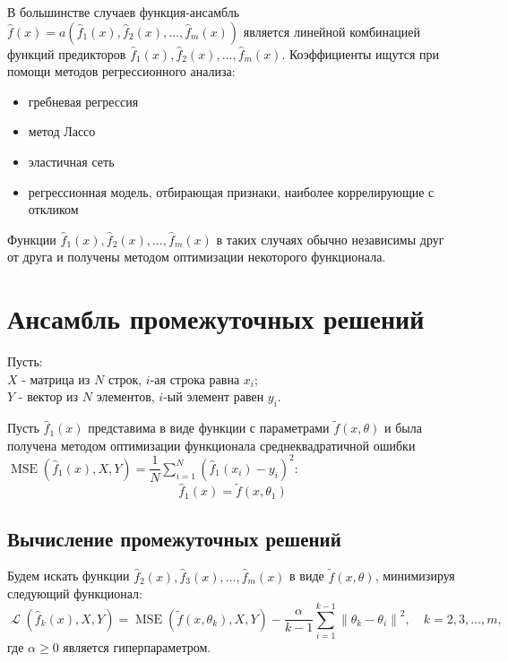 \documentclass[12pt, fleqn]{article}
\newcommand{\norm}[1]{\left\lVert#1\right\rVert}
\newcommand{\loss}{\mathop{\mathcal{L}}}
\newcommand{\mse}{\mathop{MSE}}
\newcommand{\optimizationmethodfunction}{\tilde{f}}
\newcommand{\predictionfunction}{\hat{f}}
\newcommand{\ensemblefunction}{a}
\newcommand{\distinguishparameter}{\alpha}
\newcommand{\numberobjects}{N}
\newcommand{\numberpredictionfunctions}{m}
\newcommand{\for}[3]{\sum\limits_{#1 = #2}^{#3}}  %
\newcommand{\forn}[2]{\for{#1}{1}{#2}}  %
\newcommand{\many}[3]{#1 1 #2, #1 2 #2, \dots, #1 #3 #2}  %
\newcommand{\ensemblefunctionfull}{\ensemblefunction(\many{\predictionfunction_}{(x)}{\numberpredictionfunctions})}
\begin{document}
В большинстве случаев функция-ансамбль $\predictionfunction(x) = \ensemblefunctionfull$ является линейной комбинацией функций предикторов $\many{\predictionfunction_}{(x)}{\numberpredictionfunctions}$. Коэффициенты ищутся при помощи методов регрессионного анализа:
\begin{itemize}
\item гребневая регрессия~\cite{Ridge}
\item метод Лассо~\cite{Lasso}
\item эластичная сеть~\cite{ElasticNet}
\item регрессионная модель, отбирающая признаки, наиболее коррелирующие с откликом~\cite{ConvexCombinationsBestCorrelatedWithResponse}
\end{itemize}

Функции $\many{\predictionfunction_}{(x)}{\numberpredictionfunctions}$ в таких случаях обычно независимы друг от друга и получены методом оптимизации некоторого функционала.

\section{Ансамбль промежуточных решений}

Пусть:\\
$X$ - матрица из $\numberobjects$ строк, $i$-ая строка равна $x_i$;\\
$Y$ - вектор из $\numberobjects$ элементов, $i$-ый элемент равен $y_i$.

Пусть $\predictionfunction_1(x)$ представима в виде функции с параметрами $\optimizationmethodfunction(x, \theta)$ и была получена методом оптимизации функционала среднеквадратичной ошибки
$\mse(\predictionfunction_1(x), X, Y) = \dfrac{1}{\numberobjects}\forn{i}{\numberobjects} (\predictionfunction_1(x_i) - y_i)^2$:
$$\predictionfunction_1(x) = \optimizationmethodfunction(x, \theta_1)$$

\subsection{Вычисление промежуточных решений}

Будем искать функции $\predictionfunction_2(x), \predictionfunction_3(x), \dots, \predictionfunction_\numberpredictionfunctions(x)$ в виде $\optimizationmethodfunction(x, \theta)$, минимизируя следующий функционал:
$$
\loss(\predictionfunction_k(x), X, Y) = \mse(\optimizationmethodfunction(x, \theta_k), X, Y) -
\dfrac{\distinguishparameter}{k - 1}
\forn{i}{k - 1}\norm{\theta_k - \theta_i}^2, \quad k = 2, 3, \dots, \numberpredictionfunctions,
$$
где $\distinguishparameter \geq 0$ является гиперпараметром.
\end{document}
